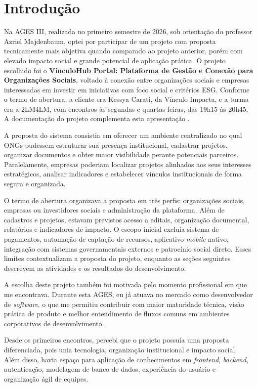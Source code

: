 \section{Introdução}

Na \ac{AGES} III, realizada no primeiro semestre de 2026, sob orientação do professor Azriel Majdenbaum, optei por participar de um projeto com proposta tecnicamente mais objetiva quando comparado ao projeto anterior, porém com elevado impacto social e grande potencial de aplicação prática. O projeto escolhido foi o \textbf{VínculoHub Portal: Plataforma de Gestão e Conexão para Organizações Sociais}, voltado à conexão entre organizações sociais e empresas interessadas em investir em iniciativas com foco social e critérios \ac{ESG}. Conforme o termo de abertura, a cliente era Kessya Carati, da Vínculo Impacta, e a turma era a 2LM4LM, com encontros às segundas e quartas-feiras, das 19h15 às 20h45. \cite{vinculotermo} A documentação do projeto complementa esta apresentação \cite{vinculohub}.

A proposta do sistema consistia em oferecer um ambiente centralizado no qual \ac{ONGs} pudessem estruturar sua presença institucional, cadastrar projetos, organizar documentos e obter maior visibilidade perante potenciais parceiros. Paralelamente, empresas poderiam localizar projetos alinhados aos seus interesses estratégicos, analisar indicadores e estabelecer vínculos institucionais de forma segura e organizada.

O termo de abertura organizava a proposta em três perfis: organizações sociais, empresas ou investidores sociais e administração da plataforma. Além de cadastros e projetos, estavam previstos acesso a editais, organização documental, relatórios e indicadores de impacto. O escopo inicial excluía sistema de pagamentos, automação de captação de recursos, aplicativo \textit{mobile} nativo, integração com sistemas governamentais externos e patrocínio social direto. Esses limites contextualizam a proposta do projeto, enquanto as seções seguintes descrevem as atividades e os resultados do desenvolvimento.

A escolha deste projeto também foi motivada pelo momento profissional em que me encontrava. Durante esta \ac{AGES}, eu já atuava no mercado como desenvolvedor de \textit{software}, o que me permitiu contribuir com maior maturidade técnica, visão prática de produto e melhor entendimento de fluxos comuns em ambientes corporativos de desenvolvimento.

Desde os primeiros encontros, percebi que o projeto possuía uma proposta diferenciada, pois unia tecnologia, organização institucional e impacto social. Além disso, havia espaço para aplicação de conhecimentos em \textit{frontend}, \textit{backend}, autenticação, modelagem de banco de dados, experiência do usuário e organização ágil de equipes.

